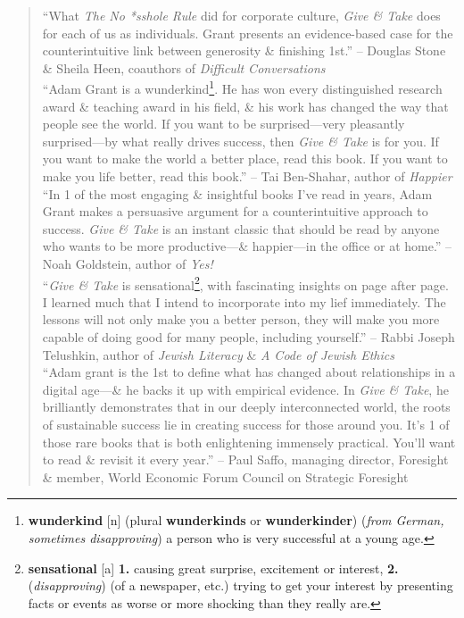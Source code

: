 \documentclass[oneside]{book}
\numberwithin{equation}{section}
\begin{document}
\begin{quotation}
	``What \textit{The No *sshole Rule} did for corporate culture, \textit{Give \& Take} does for each of us as individuals. Grant presents an evidence-based case for the counterintuitive link between generosity \& finishing 1st.'' -- Douglas Stone \& Sheila Heen, coauthors of \textit{Difficult Conversations}\\
	
	``Adam Grant is a wunderkind\footnote{\textbf{wunderkind} [n] (plural \textbf{wunderkinds} or \textbf{wunderkinder}) (\textit{from German, sometimes disapproving}) a person who is very successful at a young age.}. He has won every distinguished research award \& teaching award in his field, \& his work has changed the way that people see the world. If you want to be surprised---very pleasantly surprised---by what really drives success, then \textit{Give \& Take} is for you. If you want to make the world a better place, read this book. If you want to make you life better, read this book.'' -- Tai Ben-Shahar, author of \textit{Happier}\\
	
	``In 1 of the most engaging \& insightful books I've read in years, Adam Grant makes a persuasive argument for a counterintuitive approach to success. \textit{Give \& Take} is an instant classic that should be read by anyone who wants to be more productive---\& happier---in the office or at home.'' -- Noah Goldstein, author of \textit{Yes!}\\
	
	``\textit{Give \& Take} is sensational\footnote{\textbf{sensational} [a] \textbf{1.} causing great surprise, excitement or interest, \textbf{2.} (\textit{disapproving}) (of a newspaper, etc.) trying to get your interest by presenting facts or events as worse or more shocking than they really are.}, with fascinating insights on page after page. I learned much that I intend to incorporate into my lief immediately. The lessons will not only make you a better person, they will make you more capable of doing good for many people, including yourself.'' -- Rabbi Joseph Telushkin, author of \textit{Jewish Literacy} \& \textit{A Code of Jewish Ethics}\\
	
	``Adam grant is the 1st to define what has changed about relationships in a digital age---\& he backs it up with empirical evidence. In \textit{Give \& Take}, he brilliantly demonstrates that in our deeply interconnected world, the roots of sustainable success lie in creating success for those around you. It's 1 of those rare books that is both enlightening immensely practical. You'll want to read \& revisit it every year.'' -- Paul Saffo, managing director, Foresight \& member, World Economic Forum Council on Strategic Foresight
\end{quotation}
\end{document}
